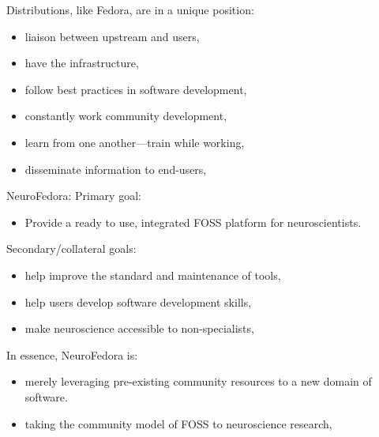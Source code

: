 \begin{frame}[c]{Distributions, like Fedora, are in a unique position:}
  \begin{itemize}
    \item \alert{liaison between upstream and users},
    \item have the \alert{infrastructure},
    \item \alert{follow best practices} in software development,
    \item constantly \alert{work community development},
    \item \alert{learn from one another}---train while working,
    \item \alert{disseminate} information to end-users,
  \end{itemize}
\end{frame}
\begin{frame}[c]{NeuroFedora:}
  \textcolor{FedoraBlue}{Primary goal:}
  \begin{itemize}
    \item Provide a \alert{ready to use, integrated FOSS platform} for neuroscientists\footnotemark[7].
  \end{itemize}
  \pause{}
  \textcolor{FirstGreen}{Secondary/collateral goals:}
  \pause{}
  \begin{itemize}
    \item help \alert{improve the standard and maintenance} of tools,
    \item help users \alert{develop software development skills},
    \item \alert{make neuroscience accessible} to non-specialists,
  \end{itemize}
\end{frame}
\begin{frame}[c]{In essence,}
  \textcolor{FedoraBlue}{NeuroFedora is:\\}
  \begin{itemize}
    \item \textcolor{FriendsMagenta}{merely leveraging pre-existing community resources to a new domain of software.}\\
      \pause{}
    \item \textcolor{FeaturesOrange}{taking the community model of FOSS to neuroscience research,}
  \end{itemize}
\end{frame}
